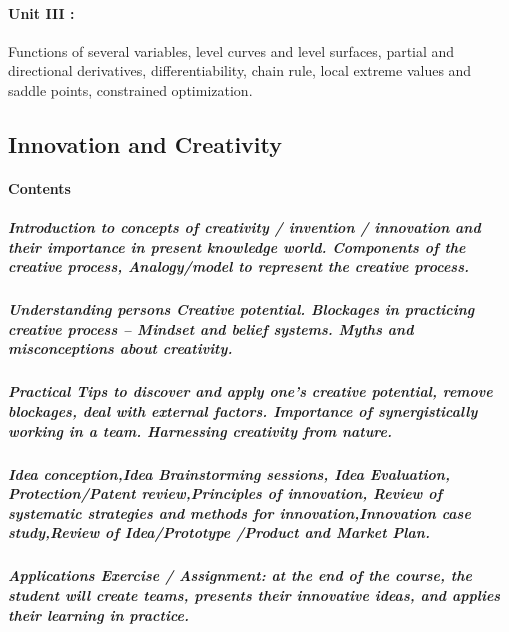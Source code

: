 \documentclass[12pt]{article}
\begin{document}
\paragraph{Unit III :} Functions of several variables, level curves and level surfaces, partial and directional 
derivatives, differentiability, chain rule, local extreme values and saddle points, constrained 
optimization. 
\vspace{1cm}
\subsection{Innovation and Creativity}
\vspace{5pt}
\paragraph{Contents}
\subparagraph{Introduction to concepts of creativity / invention / innovation and their importance in present 
knowledge world. Components of the creative process, Analogy/model to represent the creative 
process.}
\subparagraph{Understanding persons Creative potential. Blockages in practicing creative process – Mindset 
and belief systems. Myths and misconceptions about creativity.}
\subparagraph{Practical Tips to discover and apply one's creative potential, remove blockages, deal with 
external factors. Importance of synergistically working in a team. Harnessing creativity from 
nature.}
\subparagraph{\textit{Idea conception,Idea Brainstorming sessions, Idea Evaluation, Protection/Patent 
review,Principles of innovation, Review of systematic strategies and methods for 
innovation,Innovation case study,Review of Idea/Prototype /Product and Market Plan.}}
\subparagraph{Applications Exercise / Assignment: at the end of the course, the student will create teams, 
presents their innovative ideas, and applies their learning in practice.}
\end{document}

